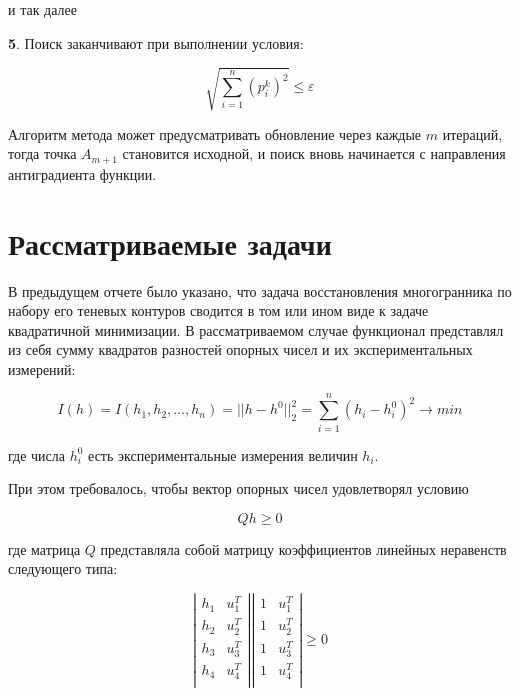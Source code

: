 \documentclass[a4paper, 12pt, titlepage]{article}
\theoremstyle{definition}
\theoremstyle{plain}
\theoremstyle{plain}
\begin{document}
и так далее

\textbf{5}. Поиск заканчивают при выполнении условия:

\begin{equation}
 \sqrt{\sum \limits_{i = 1}^{n} (p_{i}^{k})^{2}} \leq \varepsilon
\end{equation}

Алгоритм метода может предусматривать обновление через каждые $m$ итераций, 
тогда точка $A_{m + 1}$ становится исходной, и поиск вновь начинается с 
направления антиградиента функции.



\section{Рассматриваемые задачи}
\label{sec:problem}

В предыдущем отчете было указано, что задача восстановления многогранника по
набору его теневых контуров сводится в том или ином виде к задаче квадратичной
минимизации. В рассматриваемом случае функционал представлял из себя сумму
квадратов разностей опорных чисел и их экспериментальных измерений:

\begin{equation}
\label{eq:problem1}
 I(h) = I(h_{1}, h_{2}, \ldots, h_{n}) = ||h - h^{0}||_{2}^{2} =
 \sum \limits_{i = 1}^{n} (h_{i} - h_{i}^{0})^{2} \to min
\end{equation}

где числа $h_{i}^{0}$ есть экспериментальные измерения величин $h_{i}$.

При этом требовалось, чтобы вектор опорных чисел удовлетворял условию

\begin{equation}
\label{eq:problem1-cond}
 Q h \geq 0
\end{equation}

где матрица $Q$ представляла собой матрицу коэффициентов линейных неравенств
следующего типа:

\begin{equation}
\left|\begin{array}{cc}
  h_{1} & u_{1}^{T} \\
  h_{2} & u_{2}^{T} \\
  h_{3} & u_{3}^{T} \\
  h_{4} & u_{4}^{T} \\
\end{array}\right|
  \left|\begin{array}{cc}
  1 & u_{1}^{T} \\
  1 & u_{2}^{T} \\
  1 & u_{3}^{T} \\
  1 & u_{4}^{T} \\
\end{array}\right|
\geq 0
\end{equation}
\end{document}
